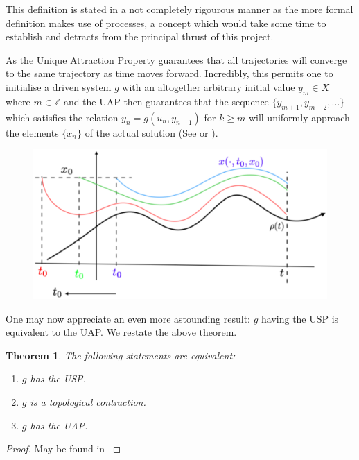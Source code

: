 \documentclass[a4paper,12pt,twoside]{report}
\newtheorem{Theorem}{Theorem}[]
\begin{document}
This definition is stated in a not completely rigourous manner as the more formal definition makes use of processes, a concept which would take some time to establish and detracts from the principal thrust of this project. 

As the Unique Attraction Property guarantees that all trajectories will converge to the same trajectory as time moves forward. 
Incredibly, this permits one to initialise a driven system $g$ with an altogether arbitrary initial value $y_m\in{X}$ where $m\in\mathbb{Z}$ and the UAP then guarantees that the sequence $\{y_{m+1}, y_{m+2},\ldots\}$ which satisfies the relation $y_n=g(u_n, y_{n-1})$  for  $k\geq{m}$  will uniformly approach the elements $\{x_n\}$ of the actual solution (See \cite[Th.11,]{Manju_Nonlinearity} or \cite[Eqn.18]{Supp}).
 

\begin{figure}[ht]
  \includegraphics[scale=0.4]{_memloss_conttime.eps}
  \centering
{}
\label{fig:memloss_conttime} 
\end{figure}

One may now appreciate an even more astounding result: $g$ having the USP is equivalent to the UAP. We restate the above theorem.

\begin{Theorem}\label{thm_usp-contr-uap}
  The following statements are equivalent:
  \vspace{-8mm}
  \begin{enumerate}[noitemsep, label=\roman*.]
    \item $g$ has the USP.
    \item $g$ is a topological contraction.
    \item $g$ has the UAP.
  \end{enumerate}
\end{Theorem}
\begin{proof}
  May be found in \cite[Th.1]{Manju_Nonlinearity}
\end{proof}
\end{document}
